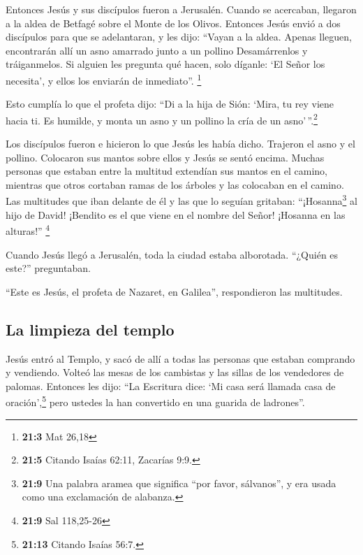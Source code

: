  Entonces Jesús y sus discípulos fueron a Jerusalén.
Cuando se acercaban, llegaron a la aldea de Betfagé sobre el Monte de
los Olivos. Entonces Jesús envió a dos discípulos para que se
adelantaran,  y les dijo: ``Vayan a la aldea. Apenas
lleguen, encontrarán allí un asno amarrado junto a un pollino
Desamárrenlos y tráiganmelos.  Si alguien les pregunta qué
hacen, solo díganle: `El Señor los necesita', y ellos los enviarán de
inmediato''. \footnote{\textbf{21:3} Mat 26,18}

 Esto cumplía lo que el profeta dijo:  ``Di
a la hija de Sión: `Mira, tu rey viene hacia ti. Es humilde, y monta un
asno y un pollino la cría de un asno'\,''.\footnote{\textbf{21:5}
  Citando Isaías 62:11, Zacarías 9:9.}

 Los discípulos fueron e hicieron lo que Jesús les había
dicho.  Trajeron el asno y el pollino. Colocaron sus
mantos sobre ellos y Jesús se sentó encima.  Muchas
personas que estaban entre la multitud extendían sus mantos en el
camino, mientras que otros cortaban ramas de los árboles y las colocaban
en el camino.  Las multitudes que iban delante de él y las
que lo seguían gritaban: ``¡Hosanna\footnote{\textbf{21:9} Una palabra
  aramea que significa ``por favor, sálvanos'', y era usada como una
  exclamación de alabanza.} al hijo de David! ¡Bendito es el que viene
en el nombre del Señor! ¡Hosanna en las alturas!'' \footnote{\textbf{21:9}
  Sal 118,25-26}

 Cuando Jesús llegó a Jerusalén, toda la ciudad estaba
alborotada. ``¿Quién es este?'' preguntaban.

 ``Este es Jesús, el profeta de Nazaret, en Galilea'',
respondieron las multitudes.

\hypertarget{la-limpieza-del-templo}{%
\subsection{La limpieza del templo}\label{la-limpieza-del-templo}}

 Jesús entró al Templo, y sacó de allí a todas las
personas que estaban comprando y vendiendo. Volteó las mesas de los
cambistas y las sillas de los vendedores de palomas. 
Entonces les dijo: ``La Escritura dice: `Mi casa será llamada casa de
oración',\footnote{\textbf{21:13} Citando Isaías 56:7.} pero ustedes la
han convertido en una guarida de ladrones''.

